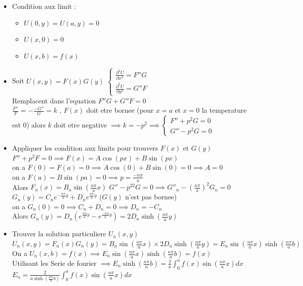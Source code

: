 \documentclass[12pt]{book}
\begin{document}
            \begin{itemize}
                \item Condition aux limit :
                    \begin{itemize}
                        \item $U(0,y) = U(a,y) = 0$
                        \item $ U(x,0) = 0 $
                        \item $ U(x,b) = f(x) $
                    \end{itemize}
                \item Soit $U(x,y)=F(x)G(y)$ 
                    $ \begin{cases} \frac{\partial^2U}{\partial x^2} = F''G \\ \frac{\partial^2U}{\partial y^2}=G''F \end{cases}$ \\
                     Remplacent dans l'equation $ F''G+G''F=0 $\\
                    $\frac{F''}{F}=-\frac{-G''}{G}=k$ , $F(x)$ doit etre bornee (pour $x=a$ et $ x=0$ la temperature est $0$) alors $k$ doit etre negative $\implies k = -p^2 \implies \begin{cases} F'' +p^2G =0 \\G''-p^2G=0 \end{cases}$
                \item Appliquer les condition aux limits pour trouvers $F(x)$ et $G(y)$ \\
                    $F'' +p^2F=0 \implies F(x) = A\cos(px)+B\sin(px)$ \\
                    on a $F(0) = F(a)=0 \implies A\cos(0)+B\sin(0) =0 \implies A =0$ \\
                    on a $F(a) = B\sin(pa) =0 \implies p=\frac{-n\pi}{a}$ \\
                    Alors $F_n(x) = B_n\sin(\frac{n\pi}{a}x)$
                    $G'' -p^22G=0 \implies G''_n -(\frac{n\pi}{a})^2G_n =0 $\\
                    $G_n(y)=C_ne^{-\frac{n\pi}{a}y}+D_ne^{\frac{n\pi}{a}y}$ ($G(y)$ n'est pas bornee)\\
                    on a $G_n(0) =0 \implies C_n+D_n =0 \implies D_n = -C_n$ \\
                    Alors $G_n(y)=D_n(e^{\frac{n\pi}{a}y}-e^{\frac{-n\pi}{a}y})=2D_n\sinh(\frac{n\pi}{a}y)$
                \item Trouver la solution particuliere $U_n(x,y)$ \\
                    $U_n(x,y)=F_n(x)G_n(y) =B_n\sin(\frac{n\pi}{a}x)\times2D_n\sinh(\frac{n\pi}{a}y) = E_n\sin(\frac{n\pi}{a}x)\sinh(\frac{n\pi}{a}b) $\\
                    On a $U_n(x,b) = f(x) \implies E_n\sin(\frac{n\pi}{a}x)\sinh(\frac{n\pi}{a}b)=f(x) $\\
                    Utilisant les Serie de fourier $\implies E_n\sinh(\frac{n\pi}{a}b) = \frac{2}{a}\int^a_0f(x)\sin(\frac{n\pi}{a}x)dx $ \\
                    $E_n=\frac{2}{a\sinh(\frac{n\pi}{a}b)}\int^a_0f(x)\sin(\frac{n\pi}{a}x)dx$
            \end{itemize}
\end{document}
